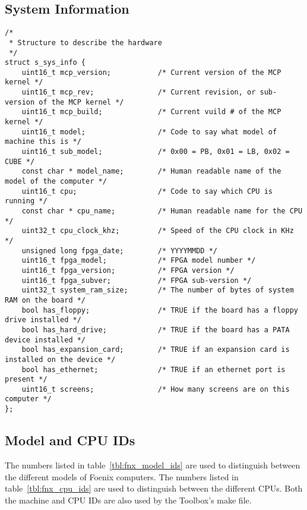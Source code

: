 \subsection*{System Information}
\begin{lstlisting}
/*
 * Structure to describe the hardware
 */
struct s_sys_info {
    uint16_t mcp_version;     		/* Current version of the MCP kernel */
    uint16_t mcp_rev;         		/* Current revision, or sub-version of the MCP kernel */
    uint16_t mcp_build;       		/* Current vuild # of the MCP kernel */
    uint16_t model;           		/* Code to say what model of machine this is */
    uint16_t sub_model;         	/* 0x00 = PB, 0x01 = LB, 0x02 = CUBE */
    const char * model_name;        /* Human readable name of the model of the computer */
    uint16_t cpu;             		/* Code to say which CPU is running */
    const char * cpu_name;          /* Human readable name for the CPU */
    uint32_t cpu_clock_khz;     	/* Speed of the CPU clock in KHz */
    unsigned long fpga_date;        /* YYYYMMDD */    
    uint16_t fpga_model;       		/* FPGA model number */
    uint16_t fpga_version;    		/* FPGA version */
    uint16_t fpga_subver;     		/* FPGA sub-version */
    uint32_t system_ram_size;		/* The number of bytes of system RAM on the board */
    bool has_floppy;                /* TRUE if the board has a floppy drive installed */
    bool has_hard_drive;            /* TRUE if the board has a PATA device installed */
    bool has_expansion_card;        /* TRUE if an expansion card is installed on the device */
    bool has_ethernet;              /* TRUE if an ethernet port is present */
    uint16_t screens;         		/* How many screens are on this computer */
};
\end{lstlisting}

\subsection*{Model and CPU IDs}
The numbers listed in table~\ref{tbl:fnx_model_ids} are used to distinguish between the different models of Foenix computers.
The numbers listed in table~\ref{tbl:fnx_cpu_ids} are used to distinguish between the different CPUs.
Both the machine and CPU IDs are also used by the Toolbox's make file.

